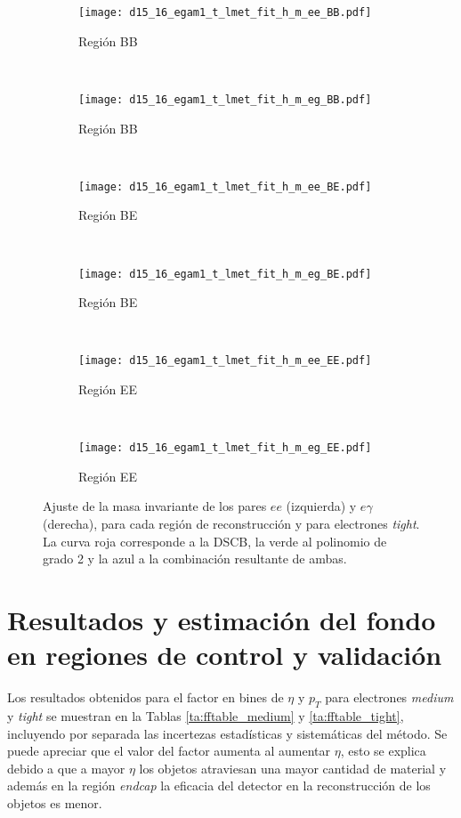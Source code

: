\begin{figure}

	\begin{subfigure}{0.5\textwidth}
		\texttt{[image: d15\_16\_egam1\_t\_lmet\_fit\_h\_m\_ee\_BB.pdf]} 
		\caption{Región BB}
	\end{subfigure}
	~
	\begin{subfigure}{0.5\textwidth}
		\texttt{[image: d15\_16\_egam1\_t\_lmet\_fit\_h\_m\_eg\_BB.pdf]}
		\caption{Región BB}
	\end{subfigure}
	~
	\begin{subfigure}{0.5\textwidth}
		\texttt{[image: d15\_16\_egam1\_t\_lmet\_fit\_h\_m\_ee\_BE.pdf]} 
		\caption{Región BE}
	\end{subfigure}
	~
	\begin{subfigure}{0.5\textwidth}
		\texttt{[image: d15\_16\_egam1\_t\_lmet\_fit\_h\_m\_eg\_BE.pdf]}
		\caption{Región BE}
	\end{subfigure}
	~
	\begin{subfigure}{0.5\textwidth}
		\texttt{[image: d15\_16\_egam1\_t\_lmet\_fit\_h\_m\_ee\_EE.pdf]} 
		\caption{Región EE}
	\end{subfigure}
	~
	\begin{subfigure}{0.5\textwidth}
		\texttt{[image: d15\_16\_egam1\_t\_lmet\_fit\_h\_m\_eg\_EE.pdf]}
		\caption{Región EE}
	\end{subfigure}

	\caption{Ajuste de la masa invariante de los pares $ee$ (izquierda) y $e\gamma$ (derecha), para cada región de reconstrucción y para electrones \textit{tight}. La curva roja corresponde a la DSCB, la verde al polinomio de grado 2 y la azul a la combinación resultante de ambas.}
\label{fits_invmass_tight}
\end{figure}




\section{Resultados y estimación del fondo en regiones de control y validación} \label{sec:resultados}


Los resultados obtenidos para el factor en bines de $\eta$ y $p_{T}$ para electrones \textit{medium} y \textit{tight} se muestran en la Tablas \ref{ta:fftable_medium} y \ref{ta:fftable_tight}, incluyendo por separada las incertezas estadísticas y sistemáticas del método. Se puede apreciar que el valor del factor aumenta al aumentar $\eta$, esto se explica debido a que a mayor $\eta$ los objetos atraviesan una mayor cantidad de material y además en la región \textit{endcap} la eficacia del detector en la reconstrucción de los objetos es menor.


